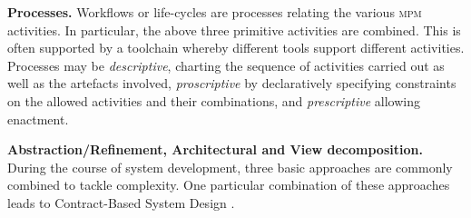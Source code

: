\noindent
\textbf{Processes.} Workflows or life-cycles are processes relating the various \textsc{mpm} activities.
In particular, the above three primitive activities are combined. This is often supported by
a toolchain whereby different tools support different activities.
%
Processes may be \emph{descriptive}, charting the sequence of activities carried out
as well as the artefacts involved, \emph{proscriptive} by declaratively 
specifying constraints on the allowed activities and their combinations,
and \emph{prescriptive} allowing enactment.

\noindent
\textbf{Abstraction/Refinement, Architectural and View decomposition.} 
During the course of system development, three basic approaches are commonly combined to tackle 
complexity. One particular combination of these approaches leads to Contract-Based System Design  \cite{SystemDesignContracts}.

